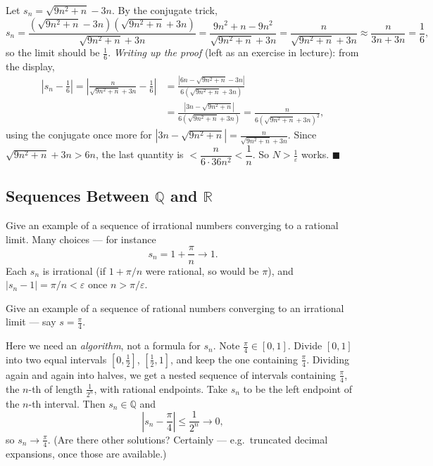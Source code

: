 \documentclass[11pt]{report}
\begin{document}
\begin{exbox}
Let $s_n = \sqrt{9n^2 + n} - 3n$. By the conjugate trick,
\[
s_n = \frac{(\sqrt{9n^2+n} - 3n)(\sqrt{9n^2+n} + 3n)}{\sqrt{9n^2+n} + 3n}
= \frac{9n^2 + n - 9n^2}{\sqrt{9n^2+n} + 3n}
= \frac{n}{\sqrt{9n^2+n} + 3n}
\approx \frac{n}{3n + 3n} = \frac16,
\]
so the limit should be $\tfrac16$. \emph{Writing up the proof} (left as an exercise in lecture): from the display,
\begin{align*}
\left| s_n - \tfrac16 \right|
= \left| \frac{n}{\sqrt{9n^2+n} + 3n} - \frac16 \right|
&= \frac{\left| 6n - \sqrt{9n^2+n} - 3n \right|}{6\left(\sqrt{9n^2+n} + 3n\right)}\\
&= \frac{\left| 3n - \sqrt{9n^2+n} \right|}{6\left(\sqrt{9n^2+n} + 3n\right)}
= \frac{n}{6\left(\sqrt{9n^2+n} + 3n\right)^2},
\end{align*}
using the conjugate once more for $|3n - \sqrt{9n^2+n}| = \frac{n}{\sqrt{9n^2+n}+3n}$. Since $\sqrt{9n^2+n} + 3n > 6n$, the last quantity is $< \dfrac{n}{6 \cdot 36 n^2} < \dfrac1n$. So $N > \tfrac1\varepsilon$ works. \hfill $\blacksquare$
\end{exbox}

\subsection{Sequences Between $\mathbb{Q}$ and $\mathbb{R}$}

\begin{exbox}
Give an example of a sequence of irrational numbers converging to a rational limit. Many choices --- for instance
\[
s_n = 1 + \frac{\pi}{n} \longrightarrow 1.
\]
Each $s_n$ is irrational (if $1 + \pi/n$ were rational, so would be $\pi$), and $|s_n - 1| = \pi/n < \varepsilon$ once $n > \pi/\varepsilon$.
\end{exbox}

\begin{exbox}
Give an example of a sequence of rational numbers converging to an irrational limit --- say $s = \tfrac{\pi}{4}$.

Here we need an \emph{algorithm}, not a formula for $s_n$. Note $\tfrac\pi4 \in [0,1]$. Divide $[0,1]$ into two equal intervals $[0, \tfrac12]$, $[\tfrac12, 1]$, and keep the one containing $\tfrac\pi4$. Dividing again and again into halves, we get a nested sequence of intervals containing $\tfrac\pi4$, the $n$-th of length $\tfrac{1}{2^n}$, with rational endpoints. Take $s_n$ to be the left endpoint of the $n$-th interval. Then $s_n \in \mathbb{Q}$ and
\[
\left| s_n - \frac\pi4 \right| \leq \frac{1}{2^n} \longrightarrow 0,
\]
so $s_n \to \tfrac\pi4$. (Are there other solutions? Certainly --- e.g.\ truncated decimal expansions, once those are available.)
\end{exbox}
\end{document}
